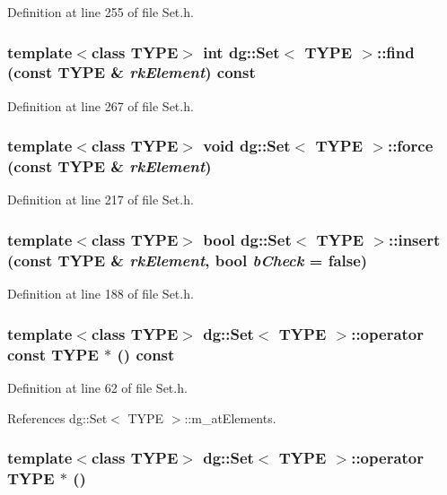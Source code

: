 Definition at line 255 of file Set.h.
\subsubsection{\setlength{\rightskip}{0pt plus 5cm}template$<$class TYPE$>$ int dg::Set$<$ TYPE $>$::find (const TYPE \& {\em rk\-Element}) const}\label{classdg_1_1Set_a16}




Definition at line 267 of file Set.h.
\subsubsection{\setlength{\rightskip}{0pt plus 5cm}template$<$class TYPE$>$ void dg::Set$<$ TYPE $>$::force (const TYPE \& {\em rk\-Element})}\label{classdg_1_1Set_a13}




Definition at line 217 of file Set.h.
\subsubsection{\setlength{\rightskip}{0pt plus 5cm}template$<$class TYPE$>$ bool dg::Set$<$ TYPE $>$::insert (const TYPE \& {\em rk\-Element}, bool {\em b\-Check} = false)}\label{classdg_1_1Set_a12}




Definition at line 188 of file Set.h.
\subsubsection{\setlength{\rightskip}{0pt plus 5cm}template$<$class TYPE$>$ dg::Set$<$ TYPE $>$::operator const TYPE $\ast$ () const\hspace{0.3cm}{\tt  [inline]}}\label{classdg_1_1Set_a10}




Definition at line 62 of file Set.h.

References dg::Set$<$ TYPE $>$::m\_\-at\-Elements.
\subsubsection{\setlength{\rightskip}{0pt plus 5cm}template$<$class TYPE$>$ dg::Set$<$ TYPE $>$::operator TYPE $\ast$ ()\hspace{0.3cm}{\tt  [inline]}}\label{classdg_1_1Set_a11}




